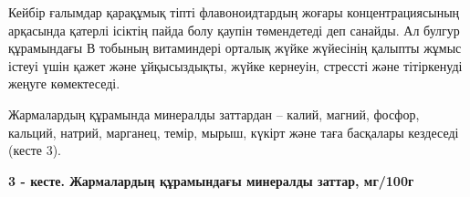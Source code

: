 Кейбір ғалымдар қарақұмық тіпті флавоноидтардың жоғары концентрациясының
арқасында қатерлі ісіктің пайда болу қаупін төмендетеді деп санайды. Ал
булгур құрамындағы В тобының витаминдері орталық жүйке жүйесінің қалыпты
жұмыс істеуі үшін қажет және ұйқысыздықты, жүйке кернеуін, стрессті және
тітіркенуді жеңуге көмектеседі.

Жармалардың құрамында минералды заттардан -- калий, магний, фосфор,
кальций, натрий, марганец, темір, мырыш, күкірт және таға басқалары
кездеседі (кесте 3).

{\bfseries 3 - кесте. Жармалардың құрамындағы минералды заттар, мг/100г}

